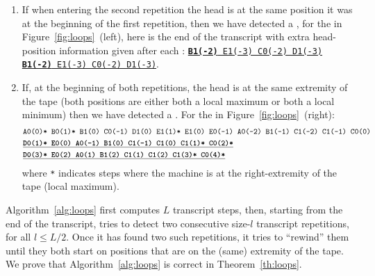 \begin{enumerate}
    \item If when entering the second repetition the head is at the same position it was at the beginning of the first repetition, then we have detected a \cycler, \eg for the \cycler in Figure~\ref{fig:loops}~(left), here is the end of the transcript with extra head-position information given after each \ssp: \texttt{\underline{\textbf{B1(-2)} E1(-3) C0(-2) D1(-3)} \underline{\textbf{B1(-2)} E1(-3) C0(-2) D1(-3)}}.

    \item If, at the beginning of both repetitions, the head is at the same extremity of the tape (\ie both positions are either both a local maximum or both a local minimum) then we have detected a \TC. For the \TC in Figure~\ref{fig:loops}~(right):
          \begin{align*}
               & \texttt{A0(0)* B0(1)* B1(0) C0(-1) D1(0) E1(1)* E1(0) E0(-1) A0(-2) B1(-1) C1(-2) C1(-1) C0(0)} \\
               & \texttt{\underline{\textbf{D0(1)* E0(0) A0(-1) B1(0) C1(-1) C1(0) C1(1)* C0(2)*}}}              \\
               & \texttt{\underline{\textbf{D0(3)* E0(2) A0(1) B1(2) C1(1) C1(2) C1(3)* C0(4)*}}}
          \end{align*}
          \noindent where \texttt{*} indicates steps where the machine is at the right-extremity of the tape (\headpos local maximum).


\end{enumerate}

Algorithm~\ref{alg:loops} first computes $L$ transcript steps, then, starting from the end of the transcript, tries to detect two consecutive size-$l$ transcript repetitions, for all $l \leq L/2$. Once it has found two such repetitions, it tries to ``rewind'' them until they both start on positions that are on the (same) extremity of the tape. We prove that Algorithm~\ref{alg:loops} is correct in Theorem~\ref{th:loops}.




